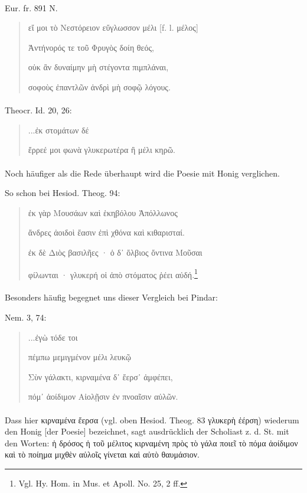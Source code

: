 \documentclass[a4paper, 11pt, oneside]{article}
\begin{document}
\paragraph{}
Eur. fr. 891 N.
\begin{quotation}
εἴ μοι τὸ Νεστόρειον εὔγλωσσον μέλι [f. l. μέλος]

Ἀντήνορός τε τοῦ Φρυγὸς δοίη θεός,

οὐκ ἂν δυναίμην μὴ στέγοντα πιμπλάναι,

σοφοὺς ἐπαντλῶν ἀνδρὶ μὴ σοφῷ λόγους.
\end{quotation}
\paragraph{}
Theocr. Id. 20, 26:
\begin{quotation}
\hspace*{15mm}...ἐκ στομάτων δέ

ἔρρεέ μοι φωνὰ γλυκερωτέρα ἢ μέλι κηρῶ.
\end{quotation}
\paragraph{}
Noch häufiger als die Rede überhaupt wird die Poesie mit Honig verglichen.

So schon bei Hesiod. Theog. 94:
\begin{quotation}
ἐκ γὰρ Μουσάων καὶ ἑκηβόλου Ἀπόλλωνος

ἄνδρες ἀοιδοὶ ἔασιν ἐπὶ χθόνα καὶ κιθαρισταί.

ἐκ δὲ Διὸς βασιλῆες · ὁ δ᾽ ὄλβιος ὄντινα Μοῦσαι

φίλωνται · γλυκερή οἱ ἀπὸ στόματος ῥέει αὐδή.\footnote{Vgl. Hy. Hom. in Mus. et Apoll. No. 25, 2 ff.}
\end{quotation}
\paragraph{}
Besonders häufig begegnet uns dieser Vergleich bei Pindar:

Nem. 3, 74:
\begin{quotation}
\hspace*{15mm}...ἐγὼ τόδε τοι

πέμπω μεμιγμένον μέλι λευκῷ

Σὺν γάλακτι, κιρναμένα δ᾽ ἔερσ᾽ ἀμφέπει,

πόμ᾽ ἀοίδιμον Αἰολῇσιν ἐν πνοαῖσιν αὐλῶν.
\end{quotation}
\paragraph{}
Dass hier κιρναμένα ἔερσα (vgl. oben Hesiod. Theog. 83 γλυκερὴ ἐέρση) wiederum den Honig [der Poesie] bezeichnet, sagt ausdrücklich der Scholiast z. d. St. mit den Worten: ἡ δρόσος ἡ τοῦ μέλιτος κιρναμένη πρὸς τὸ γάλα ποιεῖ τὸ πόμα ἀοίδιμον καὶ τὸ ποίημα μιχθὲν αὐλοῖς γίνεται καὶ αὐτὸ θαυμάσιον.
\end{document}
